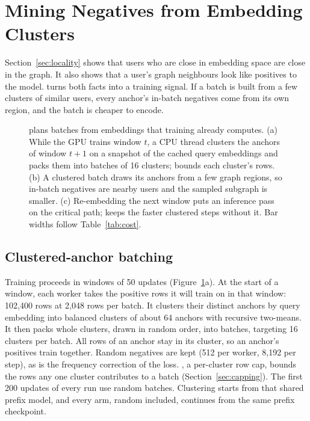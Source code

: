 \section{Mining Negatives from Embedding Clusters}
\label{sec:method}

Section~\ref{sec:locality} shows that users who are close in embedding space are close in the graph. It also shows
that a user's graph neighbours look like positives to the model. \ours{} turns both facts into a training
signal. If a batch is built from a few clusters of similar users, every anchor's in-batch negatives come from its own
region, and the batch is cheaper to encode.

\begin{figure}[t]
  \centering
  
  \caption{\ours{} plans batches from embeddings that training already computes. (a) While the GPU trains window
  $t$, a CPU thread clusters the anchors of window $t{+}1$ on a snapshot of the cached query embeddings and packs them
  into batches of 16 clusters; \rowcap{} bounds each cluster's rows. (b) A clustered batch draws its anchors from a few
  graph regions, so in-batch negatives are nearby users and the sampled subgraph is smaller. (c) Re-embedding the next
  window puts an inference pass on the critical path; \ours{} keeps the faster clustered steps without it. Bar widths
  follow Table~\ref{tab:cost}.}
  \label{fig:localneg}
\end{figure}

\subsection{Clustered-anchor batching}
\label{sec:method:batching}

Training proceeds in windows of 50 updates (Figure~\ref{fig:localneg}a). At the start of a window, each worker takes the positive rows it will
train on in that window: 102{,}400 rows at 2{,}048 rows per batch. It clusters their distinct anchors by query
embedding into balanced clusters of about 64 anchors with recursive two-means. It then packs whole clusters, drawn in
random order, into batches, targeting 16 clusters per batch. All rows of an anchor stay in its cluster, so an anchor's
positives train together. Random negatives are kept (512 per worker, 8{,}192 per step), as is the frequency correction
of the loss. \rowcap{}, a per-cluster row cap, bounds the rows any one cluster contributes to a batch (Section~\ref{sec:capping}).
The first 200 updates of every run use random batches. Clustering starts from that shared prefix model,
and every arm, random included, continues from the same prefix checkpoint.

